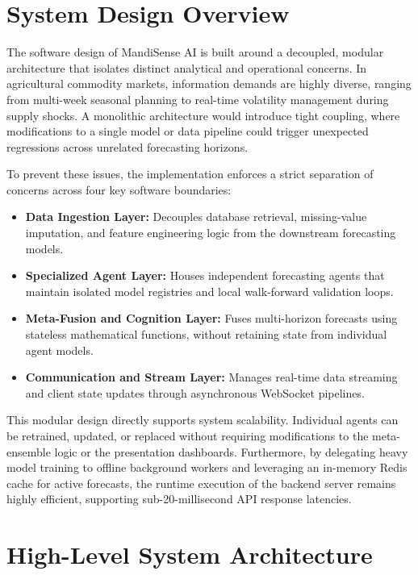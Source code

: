 \documentclass[12pt,a4paper]{report}
\theoremstyle{definition}
\theoremstyle{remark}
\begin{document}
\section{System Design Overview}

The software design of MandiSense AI is built around a decoupled, modular architecture that isolates distinct analytical and operational concerns. In agricultural commodity markets, information demands are highly diverse, ranging from multi-week seasonal planning to real-time volatility management during supply shocks. A monolithic architecture would introduce tight coupling, where modifications to a single model or data pipeline could trigger unexpected regressions across unrelated forecasting horizons.

To prevent these issues, the implementation enforces a strict separation of concerns across four key software boundaries:
\begin{itemize}
    \item \textbf{Data Ingestion Layer:} Decouples database retrieval, missing-value imputation, and feature engineering logic from the downstream forecasting models.
    \item \textbf{Specialized Agent Layer:} Houses independent forecasting agents that maintain isolated model registries and local walk-forward validation loops.
    \item \textbf{Meta-Fusion and Cognition Layer:} Fuses multi-horizon forecasts using stateless mathematical functions, without retaining state from individual agent models.
    \item \textbf{Communication and Stream Layer:} Manages real-time data streaming and client state updates through asynchronous WebSocket pipelines.
\end{itemize}

This modular design directly supports system scalability. Individual agents can be retrained, updated, or replaced without requiring modifications to the meta-ensemble logic or the presentation dashboards. Furthermore, by delegating heavy model training to offline background workers and leveraging an in-memory Redis cache for active forecasts, the runtime execution of the backend server remains highly efficient, supporting sub-20-millisecond API response latencies.

\section{High-Level System Architecture}
\end{document}
